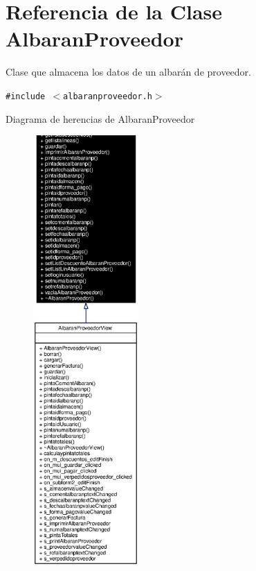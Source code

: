 \section{Referencia de la Clase Albaran\-Proveedor}
\label{classAlbaranProveedor}
Clase que almacena los datos de un albar\'{a}n de proveedor.  


{\tt \#include $<$albaranproveedor.h$>$}

Diagrama de herencias de Albaran\-Proveedor\begin{figure}[H]
\begin{center}
\leavevmode
\includegraphics[width=114pt]{classAlbaranProveedor__inherit__graph}
\end{center}
\end{figure}
